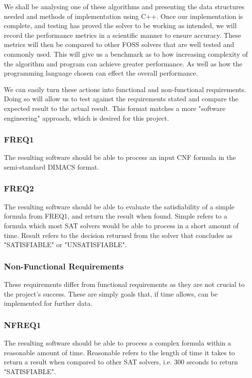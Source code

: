\documentclass{article}
\begin{document}
We shall be analysing one of these algorithms and presenting the data structures needed and methods of implementation using C++. 
Once our implementation is complete, and testing has proved the solver to be working as intended, we will record the performance 
metrics in a scientific manner to ensure accuracy. These metrics will then be compared to other FOSS solvers that are well tested 
and commonly used. This will give us a benchmark as to how increasing complexity of the algorithm and program can achieve greater 
performance. As well as how the programming language chosen can effect the overall performance.

We can easily turn these actions into functional and non-functional requirements. Doing so will allow us to test against the 
requirements stated and compare the expected result to the actual result. This format matches a more "software engineering" 
approach, which is desired for this project.

\subsubsection{FREQ1}
The resulting software should be able to process an input CNF formula in the semi-standard DIMACS format.

\subsubsection{FREQ2}
The resulting software should be able to evaluate the satisfiability of a simple formula from FREQ1, and return the result when 
found. Simple refers to a formula which most SAT solvers would be able to process in a short amount of time. Result refers to the 
decision returned from the solver that concludes as "SATISFIABLE" or "UNSATISFIABLE".

\subsubsection{Non-Functional Requirements}
These requirements differ from functional requirements as they are not crucial to the project's success. These are simply goals 
that, if time allows, can be implemented for further data.

\subsubsection{NFREQ1}
The resulting software should be able to process a complex formula within a reasonable amount of time. Reasonable refers to the 
length of time it takes to return a result when compared to other SAT solvers, i.e. 300 seconds to return "SATISFIABLE".
\end{document}
